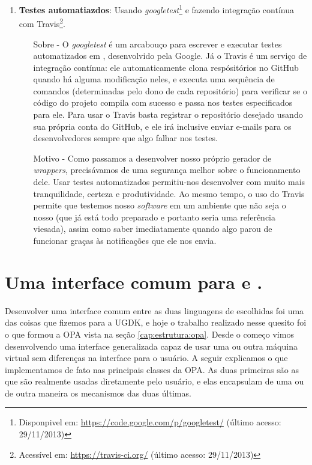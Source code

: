 \begin{enumerate}
    \item \textbf{Testes automatiazdos}: Usando \textit{googletest}\footnote{Disponpivel
      em: \url{https://code.google.com/p/googletest/} (último acesso: 29/11/2013)} e
      fazendo integração contínua com Travis\footnote{Acessível em:
      \url{https://travis-ci.org/} (último acesso: 29/11/2013)}.
      \begin{itemize}
        \item[Sobre -] O \textit{googletest} é um arcabouço para escrever e
          executar testes automatizados em \CXX{}, desenvolvido pela Google.
          Já o Travis é um serviço de integração contínua: ele
          automaticamente clona respósitórios no GitHub quando há alguma
          modificação neles, e executa uma sequência de comandos (determinadas
          pelo dono de cada repositório) para verificar se o código do projeto
          compila com sucesso e passa nos testes especificados para ele. Para usar o
          Travis basta registrar o repositório desejado usando sua própria conta
          do GitHub, e ele irá inclusive enviar e-mails para os desenvolvedores
          sempre que algo falhar nos testes.
        \item[Motivo -] Como passamos a desenvolver nosso próprio gerador de
          \textit{wrappers}, precisávamos de uma segurança melhor sobre o
          funcionamento dele. Usar testes automatizados permitiu-nos desenvolver
          com muito mais tranquilidade, certeza e produtividade. Ao mesmo tempo,
          o uso do Travis permite que testemos nosso \textit{software} em
          um ambiente que não seja o nosso (que já está todo preparado e portanto
          seria uma referência viesada), assim como saber imediatamente quando
          algo parou de funcionar graças às notificações que ele nos envia.
      \end{itemize}
  \end{enumerate}
  
  \section{Uma interface comum para  e .}
  \label{sec:atividades:opa}
  Desenvolver uma interface comum entre as duas linguagens de \script{} escolhidas
  foi uma das coisas que fizemos para a UGDK, e hoje o trabalho realizado nesse
  quesito foi o que formou a OPA vista na seção \ref{cap:estrutura:opa}. Desde o
  começo vimos desenvolvendo uma interface generalizada capaz de usar uma ou outra
  máquina virtual sem diferenças na interface para o usuário. A seguir explicamos
  o que implementamos de fato nas principais classes da OPA. As duas primeiras são
  as que são realmente usadas diretamente pelo usuário, e elas encapsulam de uma ou
  de outra maneira os mecanismos das duas últimas.
  
